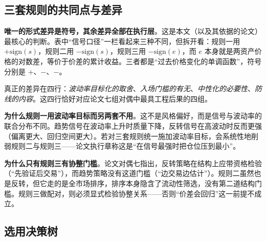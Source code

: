 \subsection{三套规则的共同点与差异}

\textbf{唯一的形式差异是符号，其余差异全部在执行层}。这是本文（以及其依据的论文）最核心的判断。表中“信号口径”一栏看起来三种不同，但拆开看：规则一用 $+\mathrm{sign}(s)$，规则二用 $-\mathrm{sign}(s)$，规则三用 $-\mathrm{sign}(e)$，而 $e$ 本身就是两资产价格的对数差，等价于价差的累计收益。三者都是“过去价格变化的单调函数”，符号分别是 $+$、$-$、$-$。

真正的差异在四行：\emph{波动率目标化的取舍}、\emph{入场门槛的有无}、\emph{中性化的必要性}、\emph{防线的内容}。这四行恰好对应论文七组对偶中最具工程后果的四组。

\textbf{为什么规则一用波动率目标而另两套不用}。这不是风格偏好，而是信号与波动率的联合分布不同。趋势信号在波动率上升时质量下降，反转信号在高波动时反而更强（偏离更大、回归空间更大）。若对三套规则统一施加波动率目标，会系统性地削弱规则二与规则三——论文执行章称这是“在信号最强时把仓位压到最小”。

\textbf{为什么只有规则三有协整门槛}。论文对偶七指出，反转策略在结构上应带资格检验（“先验证后交易”），而趋势策略没有这道门槛（“边交易边估计”）。规则二虽然也是反转，但它走的是全市场排序，排序本身隐含了流动性筛选，没有第二道结构门槛。规则三做配对，则必须显式检验协整关系——否则“价差会回归”这一前提不成立。

\subsection{选用决策树}

